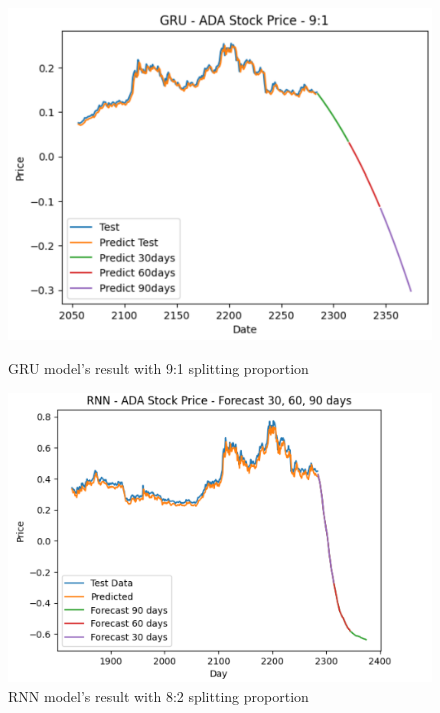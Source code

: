 \documentclass{ieeeojies}
\begin{document}
\begin{figure}[H]
    \centering
    \begin{minipage}{0.23\textwidth}
    \centering
    \includegraphics[width=1\textwidth]{bibliography/gru ada 91.png}
    \caption{GRU model's result with 9:1 splitting proportion}
    \label{fig10}
    \end{minipage}
    \hfill
    \begin{minipage}{0.24\textwidth}
    \centering
    \includegraphics[width=1\textwidth]{bibliography/Figure/PREDICT/RNN/RNN-8-2-ADA.png}
    \caption{RNN model's result with 8:2 splitting proportion}
    \label{fig11}
    \end{minipage}
\end{figure}
\end{document}
